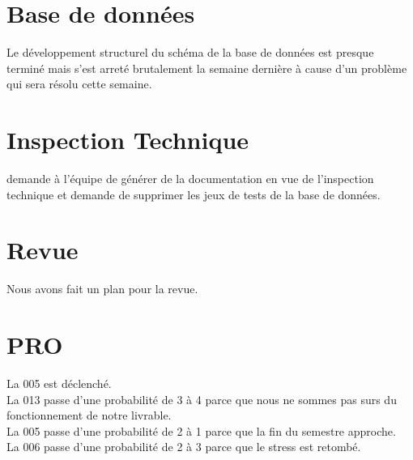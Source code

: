 \documentclass [a4paper] {article}
\begin{document}
\section{Base de données}
Le développement structurel du schéma de la base de données est presque terminé mais s'est arreté brutalement la semaine dernière à cause d'un problème qui sera résolu cette semaine.

\section{Inspection Technique}
\Michel{} demande à l'équipe de générer de la documentation en vue de l'inspection technique et demande de supprimer les jeux de tests de la base de données.

\section{Revue}
Nous avons fait un plan pour la revue.

\section{PRO}
La \FDR{} 005 est déclenché. \\
La \FDR{} 013 passe d'une probabilité de 3 à 4 parce que nous ne sommes pas surs du fonctionnement de notre livrable. \\
La \FDO{} 005 passe d'une probabilité de 2 à 1 parce que la fin du semestre approche. \\
La \FDO{} 006 passe d'une probabilité de 2 à 3 parce que le stress est retombé.


\end{document}
